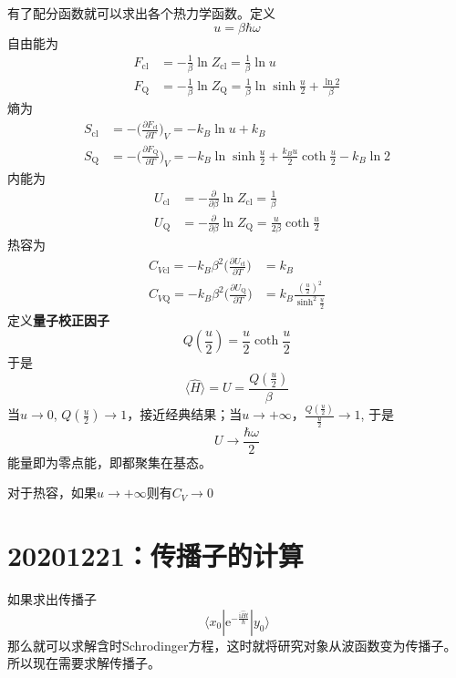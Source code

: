 \documentclass[12pt]{article}
\begin{document}
    有了配分函数就可以求出各个热力学函数。定义
    \[ u = \beta\hbar\omega \]
    自由能为
    \begin{align*}
        F_\mathrm{cl} &= -\frac 1{\beta} \ln{Z_\mathrm{cl}} = \frac 1{\beta} \ln{u}\\
        F_\mathrm{Q} &= -\frac 1{\beta} \ln{Z_\mathrm{Q}} = \frac 1{\beta}\ln{\sinh{\frac u2}}+ \frac {\ln{2}}{\beta}
    \end{align*}
    熵为
    \begin{align*}
        S_\mathrm{cl} &= -\bigg(\frac {\partial F_{\mathrm{cl}}}{\partial T}\bigg)_V = -k_B \ln{u} + k_B\\
        S_\mathrm{Q} &= -\bigg(\frac {\partial F_{\mathrm{Q}}}{\partial T}\bigg)_V = -k_B \ln{\sinh{\frac u2}} + \frac {k_Bu}2 \coth{\frac u2} - k_B \ln{2}
    \end{align*}
    内能为
    \begin{align*}
        U_\mathrm{cl} &= -\frac {\partial}{\partial \beta}\ln{Z_\mathrm{cl}} = \frac 1{\beta}\\
        U_\mathrm{Q} &= -\frac {\partial}{\partial \beta}\ln{Z_\mathrm{Q}} = \frac {u}{2\beta} \coth{\frac u2}
    \end{align*}
    热容为
    \begin{align*}
        C_{V\mathrm{cl}} = -k_B \beta^2 \bigg(\frac {\partial U_\mathrm{cl}}{\partial T}) &= k_B\\
        C_{V\mathrm{Q}} = -k_B \beta^2 \bigg(\frac {\partial U_\mathrm{Q}}{\partial T}) &= k_B \frac {(\frac u2)^2}{\sinh^2{\frac u2}}
    \end{align*}
    定义\textbf{量子校正因子}
    \[ Q(\frac u2) = \frac u2 \coth{\frac u2} \]
    于是 
    \[ \langle \hat{H} \rangle = U = \frac {Q(\frac u2)}{\beta} \]
    当$u \to 0$, $Q(\frac u2) \to 1$，接近经典结果；当$u \to +\infty$，$\frac {Q(\frac u2)}{\frac u2} \to 1$, 于是
    \[U \to \frac {\hbar \omega}2 \]
    能量即为零点能，即都聚集在基态。

    对于热容，如果$u \to +\infty$则有$C_V \to 0$

\section{20201221：传播子的计算}

    如果求出传播子
    \begin{equation*}
        \langle x_0 | \mathrm{e}^{-\frac {\mathrm{i}\hat{H}t}{\hbar}} | y_0 \rangle
    \end{equation*}
    那么就可以求解含时Schrodinger方程，这时就将研究对象从波函数变为传播子。所以现在需要求解传播子。
\end{document}

